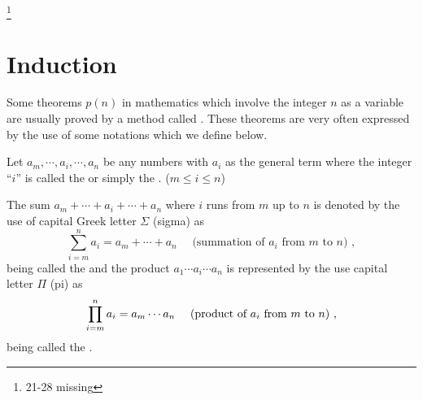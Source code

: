 \documentclass[11pt]{amsbook}
\begin{document}
\footnote{21-28 missing}



\section{Induction} 

Some theorems $p(n)$ in mathematics 
which involve the integer $n$ as a variable 
are usually proved by a method called . 
These theorems are very often expressed 
by the use of some notations which we define below.

Let $a_{m}, \cdots, a_{i}, \cdots,  a_{n}$ be any numbers 
with $a_{i}$ as the general term 
where the integer ``$i$''  is called the 
 or simply the 
. 
($m \leq i \leq n$)

The sum $a_{m} + \cdots + a_{i} + \cdots + a_{n}$ 
where $i$ runs from $m$ up to $n$ is denoted by 
the use of capital Greek letter $\Sigma$ (sigma) as
\[
	\sum_{i = m}^{n}  a_{i} 
	= a_{m} + \cdots + a_{n} 
	\quad 
	\text{ (summation of $a_{i}$ from $m$ to $n$) },
\] 
\hDefinedN{$\Sigma$} being called the 
and 
the product $a_{1} \cdots a_{i} \cdots a_{n}$ is represented 
by the use capital letter $\Pi$ (pi) as
\[
	\prod_{i = m}^{n} a_{i} 
	= a_{m} \cdots a_{n}  
	\quad
	\text{ (product of $ a_{i} $ from $m$ to $n$) },
\]
\hDefinedN{$\Pi$} being called the 
.
\end{document}
